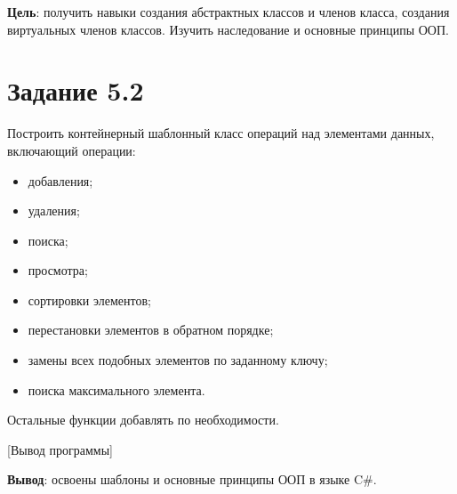 \documentclass{bsuir}
\newcommand{\csharp}{C{\liberationrm\#}}
\begin{document}

    \textbf{Цель}: получить навыки создания абстрактных классов и членов класса,
    создания виртуальных членов классов. Изучить наследование и основные принципы
    ООП.

    \section*{Задание 5.2}

    Построить контейнерный шаблонный класс операций над элементами данных,
    включающий операции:

    \begin{itemize}
        \item добавления;
        \item удаления;
        \item поиска;
        \item просмотра;
        \item сортировки элементов;
        \item перестановки элементов в обратном порядке;
        \item замены всех подобных элементов по заданному ключу;
        \item поиска максимального элемента.
    \end{itemize}

    Остальные функции добавлять по необходимости.


    [Вывод программы]

    \textbf{Вывод}: освоены шаблоны и основные принципы ООП в языке \csharp.
\end{document}
